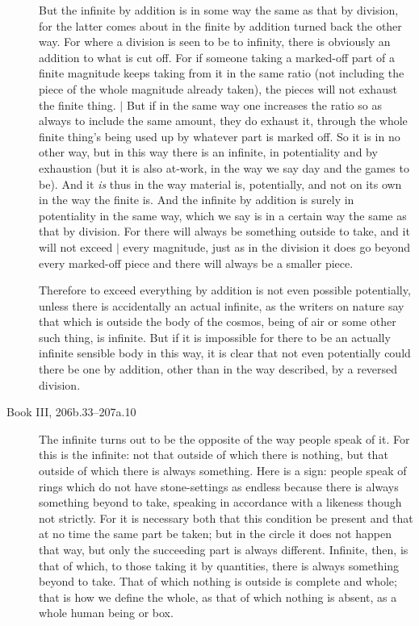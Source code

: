 \documentclass[polutonikogreek,english,twoside,openright]{article}
\begin{document}
\begin{description}
  But the infinite by addition is in some way the same as that by
  division, for the latter comes about in the finite by addition
  turned back the other way.  For where a division is seen to be to
  infinity, there is obviously an addition to what is cut off.  For if
  someone taking a marked-off part of a finite magnitude keeps taking
  from it in the same ratio (not including the piece of the whole
  magnitude already taken), the pieces will not exhaust the finite
  thing. $|$ But if in the same way one increases
  the ratio so as always to include the same amount, they do exhaust
  it, through the whole finite thing's being used up by whatever part
  is marked off.  So it is in no other way, but in this way there is
  an infinite, in potentiality and by exhaustion (but it is also
  at-work, in the way we say day and the games to be).  And it
  \emph{is} thus in the way material is, potentially, and not on its
  own in the way the finite is.  And the infinite by addition is
  surely in potentiality in the same way, which we say is in a certain
  way the same as that by division.  For there will always be
  something outside to take, and it will not exceed
  $|${\reversemarginpar{}} every magnitude, just as
  in the division it does go beyond every marked-off piece and there
  will always be a smaller piece.

  Therefore to exceed everything by addition is not even possible
  potentially, unless there is accidentally an actual infinite, as the
  writers on nature say that which is outside the body of the cosmos,
  being of air or some other such thing, is infinite.  But if it is
  impossible for there to be an actually infinite sensible body in
  this way, it is clear that not even potentially could there be one
  by addition, other than in the way described, by a reversed
  division.

\item [Book III, 206b.33--207a.10] The infinite turns out to be the
  opposite of the way people speak of it.  For this is the infinite:
  not that outside of which there is nothing, but that outside of
  which there is always something.  Here is a sign: people speak of
  rings which do not have stone-settings as endless because there is
  always something beyond to take, speaking in accordance with a
  likeness though not strictly.  For it is necessary both that this
  condition be present and that at no time the same part be taken; but
  in the circle it does not happen that way, but only the succeeding
  part is always different.  Infinite, then, is that of which, to
  those taking it by quantities, there is always something beyond to
  take.  That of which nothing is outside is complete and whole; that
  is how we define the whole, as that of which nothing is absent, as a
  whole human being or box.


\end{description}
\end{document}

